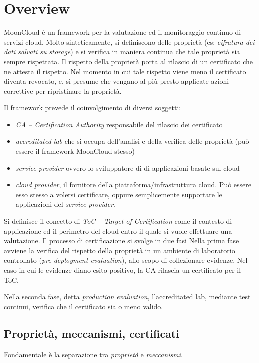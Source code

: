 \section{Overview}\label{sec:mooncloud-overview}
MoonCloud è un framework per la valutazione ed il monitoraggio continuo
di servizi cloud.
Molto sinteticamente, si definiscono delle proprietà (es: \textit{cifratura
dei dati salvati su storage}) e si verifica in maniera continua che tale
proprietà sia sempre rispettata. Il rispetto della proprietà porta al
rilascio di un certificato che ne attesta il rispetto. Nel momento in cui
tale rispetto viene meno il certificato diventa revocato, e, si presume
che vengano al più presto applicate azioni correttive per ripristinare
la proprietà.


Il framework prevede il coinvolgimento di diversi soggetti:
\begin{itemize}
	\item \textit{CA -- Certification Authority} responsabile del
	      rilascio dei certificato
	\item \textit{accreditated lab} che si occupa dell'analisi e della
	      verifica delle proprietà (può essere il framework MoonCloud stesso)
	\item \textit{service provider} ovvero lo sviluppatore di di applicazioni
	      basate sul cloud
	\item \textit{cloud provider}, il fornitore della piattaforma/infrastruttura
	      cloud. Può essere esso stesso a volersi certificare, oppure semplicemente
	      supportare le applicazioni del \textit{service provider}.
\end{itemize}

Si definisce il concetto di \textit{ToC -- Target of Certification} come il
contesto di applicazione ed il perimetro del cloud entro il quale
si vuole effettuare una valutazione.
Il processo di certificazione si svolge in due fasi Nella prima fase
avviene la verifica del rispetto della proprietà in un ambiente di
laboratorio controllato (\textit{pre-deployment evaluation}), allo scopo
di collezionare evidenze.
Nel caso in cui le evidenze diano esito positivo, la CA rilascia
un certificato per il ToC.

Nella seconda fase, detta \textit{production evaluation}, l'accreditated
lab, mediante test continui, verifica che il certificato sia o meno
valido.

\subsection{Proprietà, meccanismi, certificati}
Fondamentale è la separazione tra \textit{proprietà} e \textit{meccanismi}.

